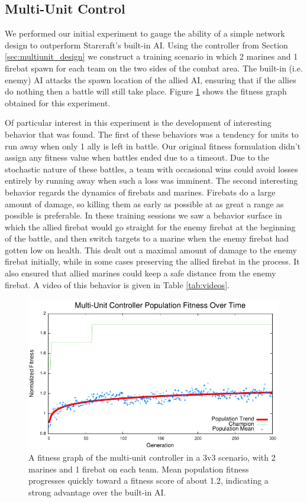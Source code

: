 \documentclass[10pt,a4paper,twocolumn]{article}
\begin{document}
\subsection{Multi-Unit Control}
\label{sec:multiunit_exp}

We performed our initial experiment to gauge the ability of a simple network design to outperform Starcraft's built-in AI. Using the controller from Section \ref{sec:multiunit_design} we construct a training scenario in which 2 marines and 1 firebat spawn for each team on the two sides of the combat area. The built-in (i.e. enemy) AI attacks the spawn location of the allied AI, ensuring that if the allies do nothing then a battle will still take place. Figure \ref{fig:multiunit_exp} shows the fitness graph obtained for this experiment.

Of particular interest in this experiment is the development of interesting behavior that was found. The first of these behaviors was a tendency for units to run away when only 1 ally is left in battle. Our original fitness formulation didn't assign any fitness value when battles ended due to a timeout. Due to the stochastic nature of these battles, a team with occasional wins could avoid losses entirely by running away when such a loss was imminent. The second interesting behavior regards the dynamics of firebats and marines. Firebats do a large amount of damage, so killing them as early as possible at as great a range as possible is preferable. In these training sessions we saw a behavior surface in which the allied firebat would go straight for the enemy firebat at the beginning of the battle, and then switch targets to a marine when the enemy firebat had gotten low on health. This dealt out a maximal amount of damage to the enemy firebat initially, while in some cases preserving the allied firebat in the process. It also ensured that allied marines could keep a safe distance from the enemy firebat. A video of this behavior is given in Table \ref{tab:videos}.

\begin{figure}
\centering
\includegraphics[scale=.59]{plots/multiunit.pdf}
\caption{A fitness graph of the multi-unit controller in a 3v3 scenario, with 2 marines and 1 firebat on each team. Mean population fitness progresses quickly toward a fitness score of about 1.2, indicating a strong advantage over the built-in AI.}
\label{fig:multiunit_exp}
\end{figure}
\end{document}

